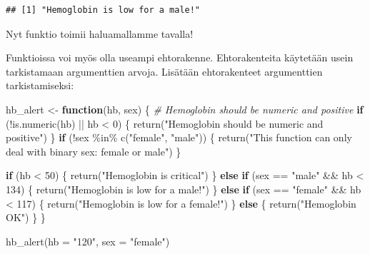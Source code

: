 \documentclass[
]{book}
\newenvironment{Shaded}{\begin{snugshade}}{\end{snugshade}}
\newcommand{\AttributeTok}[1]{\textcolor[rgb]{0.77,0.63,0.00}{#1}}
\newcommand{\CommentTok}[1]{\textcolor[rgb]{0.56,0.35,0.01}{\textit{#1}}}
\newcommand{\ControlFlowTok}[1]{\textcolor[rgb]{0.13,0.29,0.53}{\textbf{#1}}}
\newcommand{\DecValTok}[1]{\textcolor[rgb]{0.00,0.00,0.81}{#1}}
\newcommand{\FunctionTok}[1]{\textcolor[rgb]{0.00,0.00,0.00}{#1}}
\newcommand{\NormalTok}[1]{#1}
\newcommand{\OtherTok}[1]{\textcolor[rgb]{0.56,0.35,0.01}{#1}}
\newcommand{\SpecialCharTok}[1]{\textcolor[rgb]{0.00,0.00,0.00}{#1}}
\newcommand{\StringTok}[1]{\textcolor[rgb]{0.31,0.60,0.02}{#1}}
\begin{document}
\begin{verbatim}
## [1] "Hemoglobin is low for a male!"
\end{verbatim}

Nyt funktio toimii haluamallamme tavalla!

Funktioissa voi myös olla useampi ehtorakenne. Ehtorakenteita käytetään usein tarkistamaan argumenttien arvoja. Lisätään ehtorakenteet argumenttien tarkistamiseksi:

\begin{Shaded}
\begin{Highlighting}[]
\NormalTok{hb\_alert }\OtherTok{\textless{}{-}} \ControlFlowTok{function}\NormalTok{(hb, sex) \{}
  \CommentTok{\# Hemoglobin should be numeric and positive}
  \ControlFlowTok{if}\NormalTok{ (}\SpecialCharTok{!}\FunctionTok{is.numeric}\NormalTok{(hb) }\SpecialCharTok{||}\NormalTok{ hb }\SpecialCharTok{\textless{}} \DecValTok{0}\NormalTok{) \{}
    \FunctionTok{return}\NormalTok{(}\StringTok{"Hemoglobin should be numeric and positive"}\NormalTok{)}
\NormalTok{  \}}
  \ControlFlowTok{if}\NormalTok{ (}\SpecialCharTok{!}\NormalTok{sex }\SpecialCharTok{\%in\%} \FunctionTok{c}\NormalTok{(}\StringTok{"female"}\NormalTok{, }\StringTok{"male"}\NormalTok{)) \{}
    \FunctionTok{return}\NormalTok{(}\StringTok{"This function can only deal with binary sex: female or male"}\NormalTok{)}
\NormalTok{  \}}
  
  \ControlFlowTok{if}\NormalTok{ (hb }\SpecialCharTok{\textless{}} \DecValTok{50}\NormalTok{) \{}
    \FunctionTok{return}\NormalTok{(}\StringTok{"Hemoglobin is critical"}\NormalTok{)}
\NormalTok{  \} }\ControlFlowTok{else} \ControlFlowTok{if}\NormalTok{ (sex }\SpecialCharTok{==} \StringTok{"male"} \SpecialCharTok{\&\&}\NormalTok{ hb }\SpecialCharTok{\textless{}} \DecValTok{134}\NormalTok{) \{}
    \FunctionTok{return}\NormalTok{(}\StringTok{"Hemoglobin is low for a male!"}\NormalTok{)}
\NormalTok{  \} }\ControlFlowTok{else} \ControlFlowTok{if}\NormalTok{ (sex }\SpecialCharTok{==} \StringTok{"female"} \SpecialCharTok{\&\&}\NormalTok{ hb }\SpecialCharTok{\textless{}} \DecValTok{117}\NormalTok{) \{}
    \FunctionTok{return}\NormalTok{(}\StringTok{"Hemoglobin is low for a female!"}\NormalTok{)}
\NormalTok{  \} }\ControlFlowTok{else}\NormalTok{ \{}
    \FunctionTok{return}\NormalTok{(}\StringTok{"Hemoglobin OK"}\NormalTok{)}
\NormalTok{  \}}
\NormalTok{\}}

\FunctionTok{hb\_alert}\NormalTok{(}\AttributeTok{hb =} \StringTok{"120"}\NormalTok{, }\AttributeTok{sex =} \StringTok{"female"}\NormalTok{)}
\end{Highlighting}
\end{Shaded}
\end{document}
